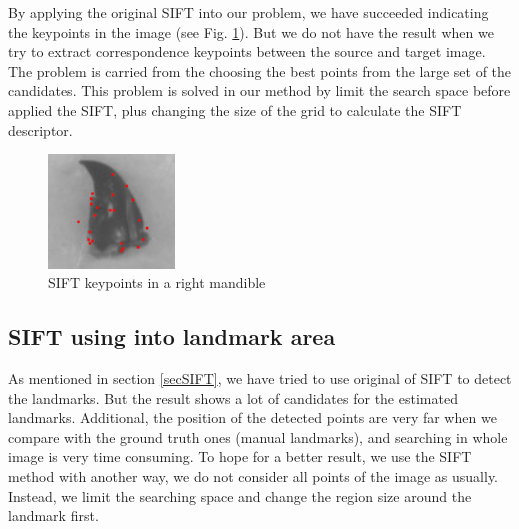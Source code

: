 \documentclass{gretsi}
\begin{document}
By applying the original SIFT into our problem, we have succeeded indicating the keypoints in the image (see Fig. \ref{fig3}). But we do not have the result when we try to extract correspondence keypoints between the source and target image. The problem is carried from the choosing the best points from the large set of the candidates. This problem is solved in our method by limit the search space before applied the SIFT, plus changing the size of the grid to calculate the SIFT descriptor.
\begin{figure}[htb]
    \centering
    \includegraphics[width=0.3\textwidth]{./images/siftc}
    \caption{SIFT keypoints in a right mandible}
    \label{fig3}
\end{figure}
\subsection{SIFT using into landmark area}
As mentioned in section \ref{secSIFT}, we have tried to use original of SIFT to detect the landmarks. But the result shows a lot of candidates for the estimated landmarks. Additional, the position of the detected points are very far when we compare with the ground truth ones (manual landmarks), and searching in whole image is very time consuming. To hope for a better result, we use the SIFT method with another way, we do not consider all points of the image as usually. Instead, we limit the searching space and change the region size around the landmark first. 
\end{document}
